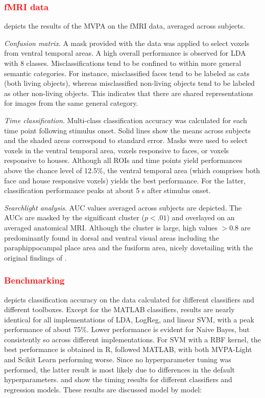 \documentclass[utf8]{frontiersSCNS} %
\newcommand{\red}[1]{\textcolor{red}{#1}}
\begin{document}
\red{\subsubsection{fMRI data}}

 depicts the results of the MVPA on the fMRI data, averaged across subjects.

\textit{Confusion matrix}. A mask provided with the data was applied to select voxels from ventral temporal areas. 
A high overall performance is observed for LDA with 8 classes. Misclassifications tend to be confined to within more general semantic categories. For instance, misclassified faces tend to be labeled as cats (both living objects), whereas misclassified non-living objects tend to be labeled as other non-living objects. This indicates that there are shared representations for images from the same general category.

\textit{Time classification}. Multi-class classification accuracy was calculated for each time point following stimulus onset. Solid lines show the means across subjects and the shaded areas correspond to standard error. Masks were used to select voxels in the ventral temporal area, voxels responsive to faces, or voxels responsive to houses. Although all ROIs and time points yield performances above the chance level of 12.5\%, the ventral temporal area (which comprises both face and house responsive voxels) yields the best performance. For the latter, classification performance peaks at about 5 s after stimulus onset.

\textit{Searchlight analysis}. AUC values averaged across subjects are depicted. The AUCs are masked by the significant cluster ($p < .01$) and overlayed on an averaged anatomical MRI. Although the cluster is large, high values $>0.8$ are predominantly found in dorsal and ventral visual areas including the paraphippocampal place area and the fusiform area, nicely dovetailing with the original findings of \cite{Haxby2001}.

\red{\subsubsection{Benchmarking}}

 depicts classification accuracy on the \cite{Wakeman2015ADataset} data calculated for different classifiers and different toolboxes. Except for the MATLAB classifiers, results are nearly identical  for all implementations of LDA, LogReg, and linear SVM, with a peak performance of about 75\%. Lower performance is evident for Naive Bayes, but consistently so across different implementations. For SVM with a RBF kernel, the best performance is obtained in R, followed MATLAB, with both MVPA-Light and Scikit Learn performing worse. Since no hyperparameter tuning was performed, the latter result is most likely due to differences in the default hyperparameters.  and  show the timing results for different classifiers and regression models. These results are discussed model by model:
\end{document}
